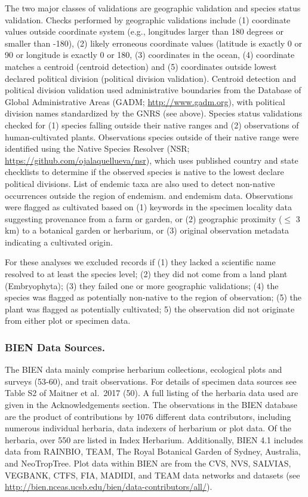 \documentclass[]{article}
\begin{document}
The two major classes of validations are geographic validation and species status validation. Checks performed by geographic validations include (1) coordinate values outside coordinate system (e.g., longitudes larger than 180 degrees or smaller than -180), (2) likely erroneous coordinate values (latitude is exactly 0 or 90 or longitude is exactly 0 or 180, (3) coordinates in the ocean, (4) coordinate matches a centroid (centroid detection) and (5) coordinates outside lowest declared political division (political division validation). Centroid detection and political division validation used administrative boundaries from the Database of Global Administrative Areas (GADM; \url{http://www.gadm.org}), with political division names standardized by the GNRS (see above). Species status validations checked for (1) species falling outside their native ranges and (2) observations of human-cultivated plants. Observations species outside of their native range were identified using the Native Species Resolver (NSR; \url{https://github.com/ojalaquellueva/nsr}), which uses published country and state checklists to determine if the observed species is native to the lowest declare political divisions. List of endemic taxa are also used to detect non-native occurrences outside the region of endemism. and endemism data. Observations were flagged as cultivated based on (1) keywords in the specimen locality data suggesting provenance from a farm or garden, or (2) geographic proximity (\(\leq\) 3 km) to a botanical garden or herbarium, or (3) original observation metadata indicating a cultivated origin.

For these analyses we excluded records if (1) they lacked a scientific name resolved to at least the species level; (2) they did not come from a land plant (Embryophyta); (3) they failed one or more geographic validations; (4) the species was flagged as potentially non-native to the region of observation; (5) the plant was flagged as potentially cultivated; 5) the observation did not originate from either plot or specimen data.

\hypertarget{bien-data-sources.}{%
\subsubsection{BIEN Data Sources.}\label{bien-data-sources.}}

The BIEN data mainly comprise herbarium collections, ecological plots and surveys (53-60), and trait observations. For details of specimen data sources see Table S2 of Maitner et al.~2017 (50). A full listing of the herbaria data used are given in the Acknowledgements section. The observations in the BIEN database are the product of contributions by 1076 different data contributors, including numerous individual herbaria, data indexers of herbarium or plot data. Of the herbaria, over 550 are listed in Index Herbarium. Additionally, BIEN 4.1 includes data from RAINBIO, TEAM, The Royal Botanical Garden of Sydney, Australia, and NeoTropTree. Plot data within BIEN are from the CVS, NVS, SALVIAS, VEGBANK, CTFS, FIA, MADIDI, and TEAM data networks and datasets (see \url{http://bien.nceas.ucsb.edu/bien/data-contributors/all/}).
\end{document}
